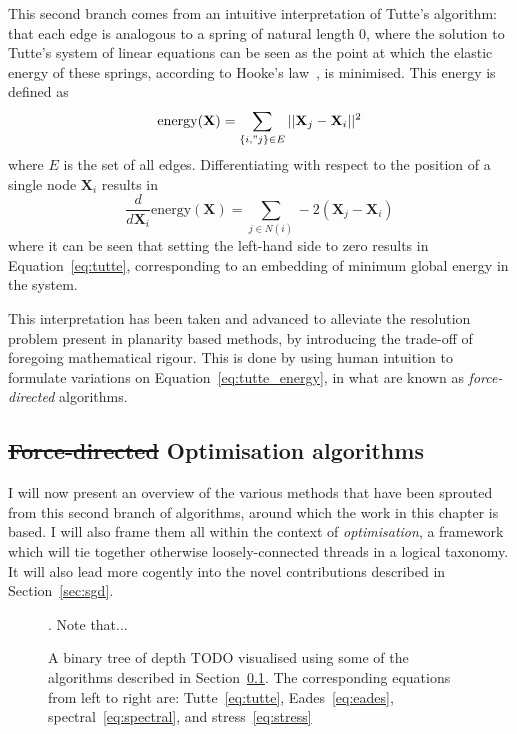 This second branch comes from an intuitive interpretation of Tutte's algorithm: that each edge is analogous to a spring of natural length 0, where the solution to Tutte's system of linear equations can be seen as the point at which the elastic energy of these springs, according to Hooke's law~\cite{Hooke1678}, is minimised. This energy is defined as
\begin{equation}
    \mathrm{energy}(\mathbf{X}) = \sum_{\{i,"j\}\in E}||\mathbf{X}_j-\mathbf{X}_i||^2
\label{eq:tutte_energy}
\end{equation}
where $E$ is the set of all edges. Differentiating with respect to the position of a single node $\mathbf{X}_i$ results in
\begin{equation}
    \frac{d}{d\mathbf{X}_i}\mathrm{energy}(\mathbf{X}) = \sum_{j\in N(i)}-2(\mathbf{X}_j-\mathbf{X}_i)
\label{eq:tutte_force}
\end{equation}
where it can be seen that setting the left-hand side to zero results in Equation~\eqref{eq:tutte}, corresponding to an embedding of minimum global energy in the system.

This interpretation has been taken and advanced to alleviate the resolution problem pre\-sent in planarity based methods, by introducing the trade-off of foregoing mathematical rigour. 
This is done by using human intuition to formulate variations on Equation~\eqref{eq:tutte_energy}, in what are known as \emph{force-directed} algorithms.

\subsection{\texorpdfstring{\st{Force-directed}{ Optimisation algorithms}}{}}
\label{sec:force_background}
I will now present an overview of the various methods that have been sprouted from this second branch of algorithms, around which the work in this chapter is based. I will also frame them all within the context of \emph{optimisation}, a framework which will tie together otherwise loosely-connected threads in a logical taxonomy.
It will also lead more cogently into the novel contributions described in Section~\ref{sec:sgd}.

\begin{figure}
    \caption{A binary tree of depth TODO visualised using some of the algorithms described in Section~\ref{sec:force_background}. The corresponding equations from left to right are: Tutte~\eqref{eq:tutte}, Eades~\eqref{eq:eades}, spectral~\eqref{eq:spectral}, and stress~\eqref{eq:stress}}.
    Note that...
    \label{fig:force_layouts}
\end{figure}

